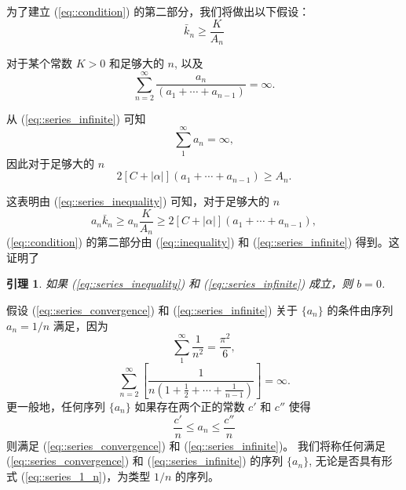 \documentclass{article}
\newtheorem{lemma}{引理}
\begin{document}
为了建立 (\ref{eq::condition}) 的第二部分，我们将做出以下假设：
\begin{equation}
    \label{eq::series_inequality}
    \bar{k}_n \geq \frac{K}{A_n}
\end{equation}

对于某个常数 $K > 0$ 和足够大的 $n$, 以及
\begin{equation}
    \label{eq::series_infinite}
    \sum_{n=2}^{\infty} \frac{a_n}{(a_1 + \cdots + a_{n-1})} = \infty.
\end{equation}

从 (\ref{eq::series_infinite}) 可知
\begin{equation}
    \sum_{1}^{\infty} a_n = \infty,
\end{equation}
因此对于足够大的 $n$
\begin{equation}
    2[C + |\alpha|](a_1 + \cdots + a_{n-1}) \geq A_n.
\end{equation}

这表明由 (\ref{eq::series_inequality}) 可知，对于足够大的 $n$
\begin{equation}
    \label{eq::inequality}
    a_n \bar{k}_n \geq a_n \frac{K}{A_n} 
    \geq 2[C + |\alpha|](a_1 + \cdots + a_{n-1}),
\end{equation}
(\ref{eq::condition}) 的第二部分由 (\ref{eq::inequality}) 
和 (\ref{eq::series_infinite}) 得到。这证明了

\begin{lemma}
    \label{lemma::condition}
如果 (\ref{eq::series_inequality}) 和 (\ref{eq::series_infinite}) 成立，则 $b = 0$.
\end{lemma}

假设 (\ref{eq::series_convergence}) 和 (\ref{eq::series_infinite}) 
关于 $\{a_n\}$ 的条件由序列 $a_n = 1/n$ 满足，因为
$$
\sum_{1}^{\infty} \frac{1}{n^2} = \frac{\pi^2}{6},
$$
$$
\sum_{n=2}^{\infty} \left[ \frac{1}{n \left( 1 + \frac{1}{2} + \cdots + \frac{1}{n-1} \right)} \right] = \infty.
$$
更一般地，任何序列 $\{a_n\}$ 如果存在两个正的常数 $c'$ 和 $c''$ 使得
\begin{equation}
    \label{eq::series_1_n}
    \frac{c'}{n} \leq a_n \leq \frac{c''}{n}
\end{equation}
则满足 (\ref{eq::series_convergence}) 和 (\ref{eq::series_infinite})。
我们将称任何满足 (\ref{eq::series_convergence}) 和 (\ref{eq::series_infinite}) 
的序列 $\{a_n\}$, 无论是否具有形式 (\ref{eq::series_1_n})，为类型 $1/n$ 的序列。
\end{document}
